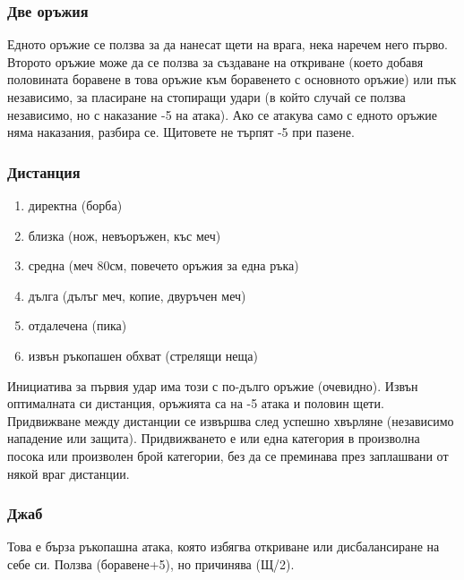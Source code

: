 \subsubsection{Две оръжия}
Едното оръжие се ползва за да нанесат щети на врага, нека наречем него първо.
Второто оръжие може да се ползва за създаване на откриване (което добавя половината боравене в това оръжие към боравенето с основното оръжие) или пък независимо, за пласиране на стопиращи удари (в който случай се ползва независимо, но с наказание -5 на атака).
Ако се атакува само с едното оръжие няма наказания, разбира се.
Щитовете не търпят -5 при пазене.


\subsubsection{Дистанция}
\begin{enumerate}
\item{директна (борба)}
\item{близка (нож, невъоръжен, къс меч)}
\item{средна (меч 80см, повечето оръжия за една ръка)}
\item{дълга (дълъг меч, копие, двуръчен меч)}
\item{отдалечена (пика)}
\item{извън ръкопашен обхват (стрелящи неща)}
\end{enumerate}
Инициатива за първия удар има този с по-дълго оръжие (очевидно).
Извън оптималната си дистанция, оръжията са на -5 атака и половин щети.
Придвижване между дистанции се извършва след успешно хвърляне (независимо нападение или защита).
Придвижването е или една категория в произволна посока или произволен брой категории, без да се преминава през заплашвани от някой враг дистанции.
\\


\subsubsection{Джаб}
Това е бърза ръкопашна атака, която избягва откриване или дисбалансиране на себе си.
Ползва (боравене+5), но причинява (Щ/2).


